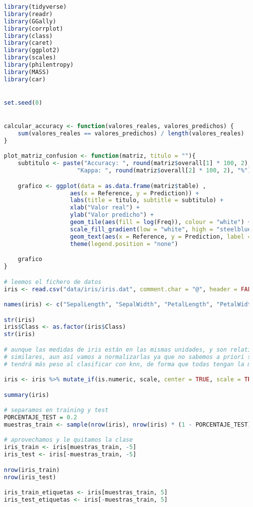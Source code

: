 \begin{lstlisting}[language=R]
library(tidyverse)
library(readr)
library(GGally)
library(corrplot)
library(class)
library(caret)
library(ggplot2)
library(scales)
library(philentropy)
library(MASS)
library(car)


set.seed(0)


calcular_accuracy <- function(valores_reales, valores_predichos) {
	sum(valores_reales == valores_predichos) / length(valores_reales)
}

plot_matriz_confusion <- function(matriz, titulo = ""){
	subtitulo <- paste("Accuracy: ", round(matriz$overall[1] * 100, 2), "% \t",
					 "Kappa: ", round(matriz$overall[2] * 100, 2), "%")

	grafico <- ggplot(data = as.data.frame(matriz$table) ,
				   aes(x = Reference, y = Prediction)) +
				   labs(title = titulo, subtitle = subtitulo) +
				   xlab("Valor real") +
				   ylab("Valor predicho") +
				   geom_tile(aes(fill = log(Freq)), colour = "white") +
				   scale_fill_gradient(low = "white", high = "steelblue") +
				   geom_text(aes(x = Reference, y = Prediction, label = Freq)) +
				   theme(legend.position = "none")

	grafico
}

# leemos el fichero de datos
iris <- read.csv("data/iris/iris.dat", comment.char = "@", header = FALSE)

names(iris) <- c("SepalLength", "SepalWidth", "PetalLength", "PetalWidth", "Class")

str(iris)
iris$Class <- as.factor(iris$Class)
str(iris)

# aunque las medidas de iris están en las mismas unidades, y son relativamente
# similares, aun así vamos a normalizarlas ya que no sabemos a priori si alguna
# tendrá más peso al clasificar con knn, de forma que todas tengan la misma importancia

iris <- iris %>% mutate_if(is.numeric, scale, center = TRUE, scale = TRUE)

summary(iris)

# separamos en training y test
PORCENTAJE_TEST = 0.2
muestras_train <- sample(nrow(iris), nrow(iris) * (1 - PORCENTAJE_TEST))

# aprovechamos y le quitamos la clase
iris_train <- iris[muestras_train, -5]
iris_test <- iris[-muestras_train, -5]

nrow(iris_train)
nrow(iris_test)

iris_train_etiquetas <- iris[muestras_train, 5]
iris_test_etiquetas <- iris[-muestras_train, 5]



\end{lstlisting}
